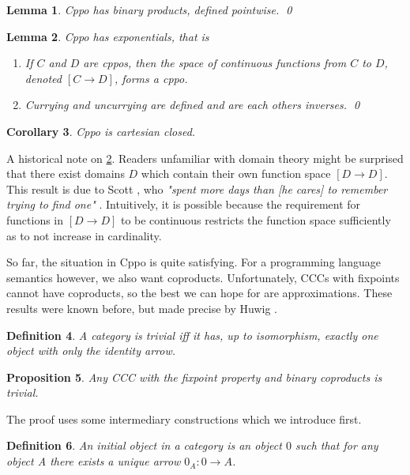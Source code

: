 \documentclass[a4paper]{article}
\newcommand{\arr}{\rightarrow}
\newtheorem{definition}{Definition}[section]
\newtheorem{proposition}[definition]{Proposition}
\newtheorem{lemma}[definition]{Lemma}
\newtheorem{corollary}[definition]{Corollary}
\begin{document}
\begin{lemma} \label{lemCppoBinaryProducts}
Cppo has binary products, defined pointwise. \qed
\end{lemma}

\begin{lemma} \label{lemCppoExponentials}
Cppo has exponentials, that is
\begin{enumerate}[noitemsep]
  \item If $C$ and $D$ are cppos, then the space of continuous functions from
  $C$ to $D$, denoted $[C \arr D]$, forms a cppo.
  \item Currying and uncurrying are defined and are each others inverses. \qed
\end{enumerate}
\end{lemma}

\begin{corollary}
Cppo is cartesian closed.
\end{corollary}

A historical note on \ref{lemCppoExponentials}. Readers unfamiliar with domain
theory might be surprised that there exist domains $D$ which contain their own
function space $[D \arr D]$.  This result is due to Scott \cite{Scott1990}, who
\emph{"spent more days than [he cares] to remember trying to find one"}
\cite{Scott1993}. Intuitively, it is possible because the
requirement for functions in $[D \arr D]$ to be continuous restricts the
function space sufficiently as to not increase in cardinality.

So far, the situation in Cppo is quite satisfying. For a programming language
semantics however, we also want coproducts. Unfortunately, CCCs with fixpoints
cannot have coproducts, so the best we can hope for are approximations.  These
results were known before, but made precise by Huwig \cite{Huwig1990}.

\begin{definition}
A category is \emph{trivial} iff it has, up to isomorphism, exactly one object
with only the identity arrow.
\end{definition}

\begin{proposition} \label{propCCCNoFixpointCoproducts}
Any CCC with the fixpoint property and binary coproducts is trivial.
\end{proposition}

The proof uses some intermediary constructions which we introduce first.

\begin{definition}
An \emph{initial object} in a category is an object $0$ such that for any object
A there exists a unique arrow $0_A : 0 \arr A$.
\end{definition}
\end{document}
